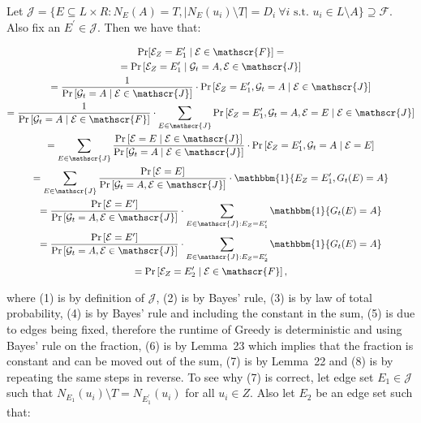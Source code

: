 \documentclass[10pt,a4paper]{article}
\begin{document}
Let $\mathscr{J}=\{E\subseteq L\times R:N_{E}(A)=T,|N_{E}(u_{i})\setminus T|=D_{i}\ \forall i\text{ s.t. }u_{i}\in L\setminus A\}\supseteq\mathscr{F}$.
Also fix an $E^{\prime}\in\mathscr{J}$.
Then we have that:\par


\[\begin{gathered}
\displaystyle\Pr[ \displaystyle\mathcal{E}_{Z}=E^{\prime}_{1}\mid\mathcal{E}\in\mathscr{F}]= \\
\displaystyle=\Pr\left[\mathcal{E}_{Z}=E^{\prime}_{1}\mid\mathcal{G}_{t}=A,\mathcal{E}\in\mathscr{J}\right] \\
\displaystyle=\frac{1}{\Pr\left[\mathcal{G}_{t}=A\mid\mathcal{E}\in\mathscr{J}\right]}\cdot\Pr\left[\mathcal{E}_{Z}=E^{\prime}_{1},\mathcal{G}_{t}=A\mid\mathcal{E}\in\mathscr{J}\right] \\
\displaystyle=\frac{1}{\Pr\left[\mathcal{G}_{t}=A\mid\mathcal{E}\in\mathscr{F}\right]}\cdot\sum_{E\in\mathscr{J}}\Pr\left[\mathcal{E}_{Z}=E^{\prime}_{1},\mathcal{G}_{t}=A,\mathcal{E}=E\mid\mathcal{E}\in\mathscr{J}\right] \\
\displaystyle=\sum_{E\in\mathscr{J}}\frac{\Pr\left[\mathcal{E}=E\mid\mathcal{E}\in\mathscr{J}\right]}{\Pr\left[\mathcal{G}_{t}=A\mid\mathcal{E}\in\mathscr{J}\right]}\cdot\Pr\left[\mathcal{E}_{Z}=E^{\prime}_{1},\mathcal{G}_{t}=A\mid\mathcal{E}=E\right] \\
\displaystyle=\sum_{E\in\mathscr{J}}\frac{\Pr\left[\mathcal{E}=E\right]}{\Pr\left[\mathcal{G}_{t}=A,\mathcal{E}\in\mathscr{J}\right]}\cdot\mathbbm{1}\{E_{Z}=E^{\prime}_{1},G_{t}(E)=A\} \\
\displaystyle=\frac{\Pr\left[\mathcal{E}=E^{\prime}\right]}{\Pr\left[\mathcal{G}_{t}=A,\mathcal{E}\in\mathscr{J}\right]}\cdot\sum_{E\in\mathscr{J}:E_{Z}=E^{\prime}_{1}}\mathbbm{1}\{G_{t}(E)=A\} \\
\displaystyle=\frac{\Pr\left[\mathcal{E}=E^{\prime}\right]}{\Pr\left[\mathcal{G}_{t}=A,\mathcal{E}\in\mathscr{J}\right]}\cdot\sum_{E\in\mathscr{J}:E_{Z}=E^{\prime}_{2}}\mathbbm{1}\{G_{t}(E)=A\} \\
\displaystyle=\Pr\left[\mathcal{E}_{Z}=E^{\prime}_{2}\mid\mathcal{E}\in\mathscr{F}\right],
\end{gathered}\]


where (1) is by definition of $\mathscr{J}$, (2) is by Bayes’ rule, (3) is by law of total probability, (4) is by Bayes’ rule and including the constant in the sum, (5) is due to edges being fixed, therefore the runtime of Greedy is deterministic and using Bayes’ rule on the fraction, (6) is by Lemma 23 which implies that the fraction is constant and can be moved out of the sum, (7) is by Lemma 22 and (8) is by repeating the same steps in reverse.
To see why (7) is correct, let edge set $E_{1}\in\mathscr{J}$ such that $N_{E_{1}}(u_{i})\setminus T=N_{E^{\prime}_{1}}(u_{i})$ for all $u_{i}\in Z$. Also let $E_{2}$ be an edge set such that:\par
\end{document}
